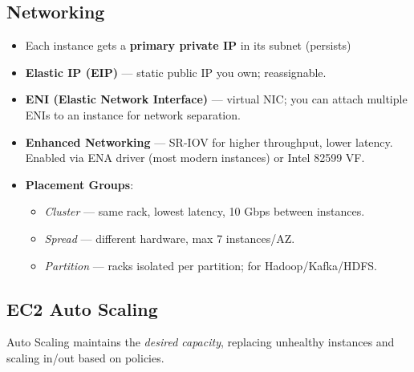 \subsection{Networking}

\begin{keyfacts}
\begin{itemize}
  \item Each instance gets a \textbf{primary private IP} in its subnet (persists)
  \item \textbf{Elastic IP (EIP)} — static public IP you own; reassignable.
  \item \textbf{ENI (Elastic Network Interface)} — virtual NIC; you can attach
        multiple ENIs to an instance for network separation.
  \item \textbf{Enhanced Networking} — SR-IOV for higher throughput, lower latency.
        Enabled via ENA driver (most modern instances) or Intel 82599 VF.
  \item \textbf{Placement Groups}:
    \begin{itemize}
      \item \emph{Cluster} — same rack, lowest latency, 10 Gbps between instances.
      \item \emph{Spread} — different hardware, max 7 instances/AZ.
      \item \emph{Partition} — racks isolated per partition; for Hadoop/Kafka/HDFS.
    \end{itemize}
\end{itemize}
\end{keyfacts}

\subsection{EC2 Auto Scaling}

Auto Scaling maintains the \emph{desired capacity}, replacing unhealthy instances
and scaling in/out based on policies.

